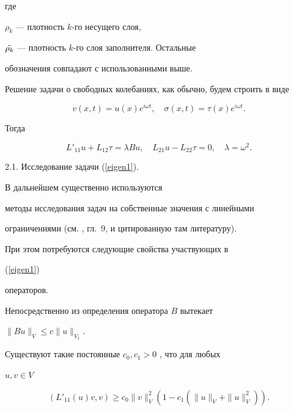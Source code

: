 где


$ {\rho_k} $ --- плотность $k$-го несущего слоя, 


$ \Tilde {\rho_k} $ --- плотность $k$-го слоя заполнителя. Остальные 


обозначения совпадают с использованными выше.


Решение задачи о свободных колебаниях, как обычно, будем строить в виде


$$


v(x,t)=u(x)e^{i\omega t},\quad \sigma(x,t)= \tau(x) e^{i\omega t}.


$$


Тогда


\begin{equation}


\label{eigen1}


L'_{11}u + L_{12} \tau = \lambda Bu, \quad


L_{21}u - L_{22} \tau = 0, \quad \lambda = \omega^2.


\end{equation}





2.1. Исследование задачи (\ref{eigen1}).


В дальнейшем существенно используются 


методы исследования задач на собственные значения с линейными 


ограничениями (см. \cite{Dya}, гл.~9, \cite{Mer} и цитированную там литературу).


При этом потребуются следующие свойства участвующих в 


(\ref{eigen1}) 


операторов.





Непосредственно из определения оператора $B$ вытекает 





\begin{lem} 


\label{estB}


$


\| Bu \|_V \le c \| u \|_{V_1}.


$


\end{lem} 


\begin{lem}


Существуют такие постоянные $c_0, c_1 > 0$ , что для любых


$u, v \in V $


\begin{equation}


\label{Adam1}


 \left ( L'_{11} (u) v, v \right )


\ge c_0 \|v \|_V^2 \left ( 1 - c_1 (\|u\|_V 


+\|u\|^2_V ) \right ).


\end{equation}


\end{lem} 





